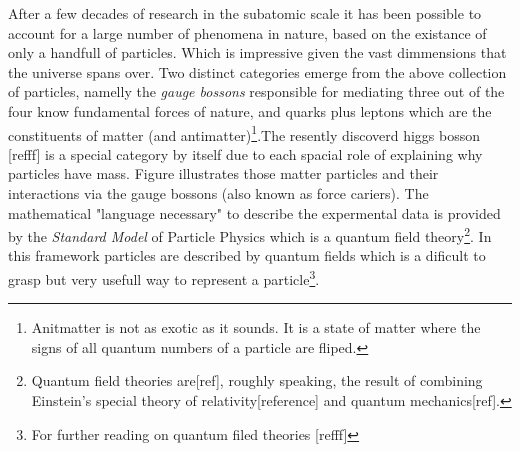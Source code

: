 After a few decades of research in the subatomic scale it has been possible to account for a large number of phenomena
in nature, based on the existance of only a handfull of particles. Which is impressive given the vast dimmensions that the
universe spans over. Two distinct categories emerge from the above collection of particles, namelly the {\it gauge
bossons} responsible for mediating three out of the four know fundamental forces of nature, and quarks plus leptons which are the
constituents of matter (and antimatter)\footnote{Anitmatter is not as exotic as it sounds. It is a state of matter where the
signs of all quantum numbers of a particle are fliped.}.The resently discoverd higgs bosson [refff] is a special category by
itself due to each spacial role of explaining why particles have mass.
Figure \figref{} illustrates those matter particles and their interactions via the gauge bossons (also known as force cariers).
The mathematical "language necessary" to describe the expermental data is provided by the \textit{Standard Model} of Particle Physics
which is a quantum field theory\footnote{Quantum field theories are[ref], roughly speaking, the result of combining Einstein's special theory of
relativity[reference] and quantum mechanics[ref].}. In this framework particles are described by quantum fields which is a dificult
to grasp but very usefull way to represent a particle\footnote{For further reading on quantum filed theories [refff]}.

